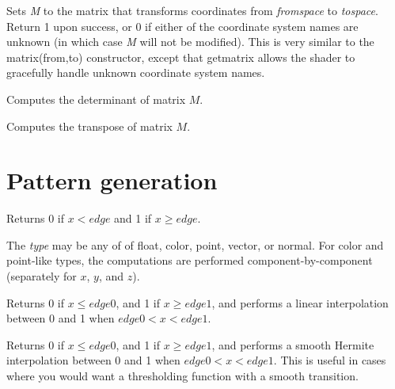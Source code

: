 \documentclass[11pt,letterpaper]{book}
\def\color{{\cf color}\xspace}
\def\float{{\cf float}\xspace}
\def\matrix{{\cf matrix}\xspace}
\def\normal{{\cf normal}\xspace}
\def\point{{\cf point}\xspace}
\def\vector{{\cf vector}\xspace}
\begin{document}

Sets \emph{M} to the \matrix that transforms coordinates from
\emph{fromspace} to \emph{tospace}.  Return 1 upon success, or 0 if
either of the coordinate system names are unknown (in which case
\emph{M} will not be modified).  This is very similar to the
{\cf matrix(from,to)} constructor, except that {\cf getmatrix} allows
the shader to gracefully handle unknown coordinate system names.
\apiend

Computes the determinant of matrix $M$.
\apiend

Computes the transpose of matrix $M$.
\apiend



\section{Pattern generation}
\label{sec:stdlib:pattern}

Returns 0 if $x < {\mathit edge}$ and 1 if $x \ge {\mathit edge}$.

The \emph{type} may be any of of \float, \color, \point, \vector, or
\normal.  For \color and \point-like types, the computations are
performed component-by-component (separately for $x$, $y$, and $z$).
\apiend

Returns 0 if $x \le {\mathit edge0}$, and 1 if $x \ge {\mathit edge1}$,
and performs a linear
interpolation between 0 and 1 when ${\mathit edge0} < x < {\mathit edge1}$.
\apiend

Returns 0 if $x \le {\mathit edge0}$, and 1 if $x \ge {\mathit edge1}$,
and performs a smooth Hermite
interpolation between 0 and 1 when ${\mathit edge0} < x < {\mathit edge1}$.
This is useful in cases where you would want a thresholding function
with a smooth transition.
\end{document}
